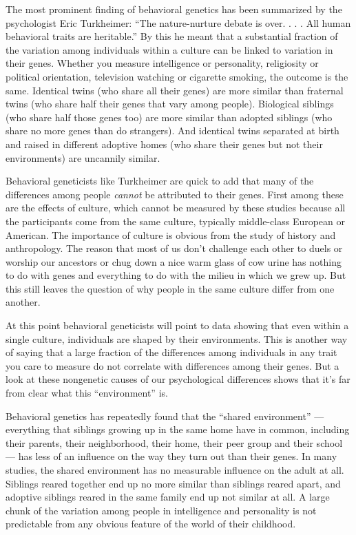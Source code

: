 The most prominent finding of behavioral genetics has been summarized by
the psychologist Eric Turkheimer: ``The nature-nurture debate is over. .
. . All human behavioral traits are heritable.'' By this he meant that a
substantial fraction of the variation among individuals within a culture
can be linked to variation in their genes. Whether you measure
intelligence or personality, religiosity or political orientation,
television watching or cigarette smoking, the outcome is the same.
Identical twins (who share all their genes) are more similar than
fraternal twins (who share half their genes that vary among people).
Biological siblings (who share half those genes too) are more similar
than adopted siblings (who share no more genes than do strangers). And
identical twins separated at birth and raised in different adoptive
homes (who share their genes but not their environments) are uncannily
similar.

Behavioral geneticists like Turkheimer are quick to add that many of the
differences among people \emph{cannot} be attributed to their genes.
First among these are the effects of culture, which cannot be measured
by these studies because all the participants come from the same
culture, typically middle-class European or American. The importance of
culture is obvious from the study of history and anthropology. The
reason that most of us don't challenge each other to duels or worship
our ancestors or chug down a nice warm glass of cow urine has nothing to
do with genes and everything to do with the milieu in which we grew up.
But this still leaves the question of why people in the same culture
differ from one another.

At this point behavioral geneticists will point to data showing that
even within a single culture, individuals are shaped by their
environments. This is another way of saying that a large fraction of the
differences among individuals in any trait you care to measure do not
correlate with differences among their genes. But a look at these
nongenetic causes of our psychological differences shows that it's far
from clear what this ``environment'' is.

Behavioral genetics has repeatedly found that the ``shared environment''
--- everything that siblings growing up in the same home have in common,
including their parents, their neighborhood, their home, their peer
group and their school --- has less of an influence on the way they turn
out than their genes. In many studies, the shared environment has no
measurable influence on the adult at all. Siblings reared together end
up no more similar than siblings reared apart, and adoptive siblings
reared in the same family end up not similar at all. A large chunk of
the variation among people in intelligence and personality is not
predictable from any obvious feature of the world of their childhood.

